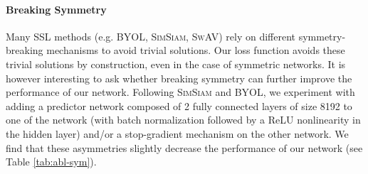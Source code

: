 




\paragraph{Breaking Symmetry} Many SSL methods (e.g. \textsc{BYOL}, \textsc{SimSiam}, \textsc{SwAV}) rely on different symmetry-breaking mechanisms to avoid trivial solutions. Our loss function avoids these trivial solutions by construction, even in the case of symmetric networks. It is however interesting to ask whether breaking symmetry can further improve the performance of our network. Following \textsc{SimSiam} and \textsc{BYOL}, we experiment with adding a predictor network composed of 2 fully connected layers of size 8192 to one of the network (with batch normalization followed by a ReLU nonlinearity in the hidden layer) and/or a stop-gradient mechanism on the other network. We find that these asymmetries slightly decrease the performance of our network (see Table \ref{tab:abl-sym}). 

